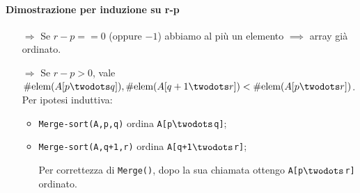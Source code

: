 \paragraph{Dimostrazione per induzione su r-p} 
\begin{itemize}
    \item[$\Rightarrow$] Se $r-p == 0 $ (oppure $-1$) abbiamo al
    più un elemento $\implies$ array già ordinato.
    \item[$\Rightarrow$] Se $r-p > 0$, vale 
    $\#\text{elem}(A[p \twodots q]),\#\text{elem}(A[q+1 \twodots r]) 
    < \#\text{elem}(A[p \twodots r])$.
    Per ipotesi induttiva:
    \begin{itemize}
        \item \texttt{Merge-sort(A,p,q)} ordina \texttt{A[p$\twodots$q]};
        \item \texttt{Merge-sort(A,q+1,r)} ordina \texttt{A[q+1$\twodots$r]}; \par
        Per correttezza di \texttt{Merge()}, dopo la sua chiamata ottengo 
        \texttt{A[p$\twodots$r]} ordinato.
    \end{itemize}
\end{itemize} 